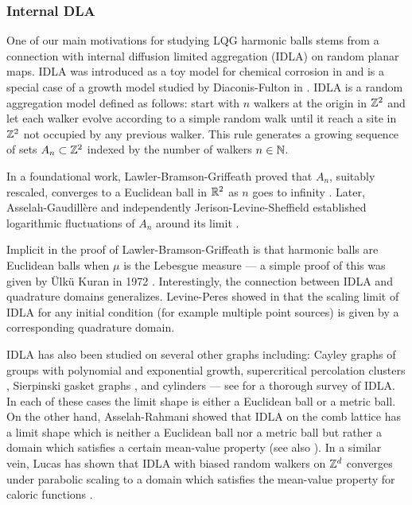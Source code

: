 \documentclass[12pt]{amsart}
\numberwithin{equation}{section}
\begin{document}
	
	
	\subsubsection{Internal DLA}
	One of our main motivations for studying LQG harmonic balls stems from a connection with internal diffusion limited aggregation (IDLA) on random planar maps. 
	IDLA was introduced as a toy model for chemical corrosion in \cite{meakin1986formation} and is a special case of a growth model studied by Diaconis-Fulton in \cite{diaconis1991growth}. IDLA is a random aggregation model defined as follows: start with $n$ walkers at the origin in $\mathbb{Z}^2$ and let each walker evolve according to a simple random walk until it reach a site in $\mathbb{Z}^2$ not occupied by any previous walker. This rule
	generates a growing sequence of sets $A_n \subset \mathbb{Z}^2$ indexed by the number of walkers $n \in \mathbb{N}$. 
	
	In a foundational work, Lawler-Bramson-Griffeath proved that $A_n$, suitably rescaled, converges to a Euclidean ball in $\mathbb{R}^2$
	as $n$ goes to infinity \cite{lawler1992internal, lawler1995subdiffusive}. Later, Asselah-Gaudillère \cite{asselah2013logarithmic, asselah2013sublogarithmic} and independently Jerison-Levine-Sheffield established logarithmic fluctuations of $A_n$ around its limit \cite{jerison2012logarithmic, jerison2013internal, jerison2014internal}. 
	
	Implicit in the proof of Lawler-Bramson-Griffeath is that harmonic balls are Euclidean balls when $\mu$ is the Lebesgue measure ---
	a simple proof of this was given by {\"U}lk{\"u} Kuran in 1972 \cite{kuran1972mean}. Interestingly, the connection between IDLA and quadrature domains generalizes. Levine-Peres showed in \cite{levine2010scaling} that the scaling limit of IDLA for any initial condition (for example multiple point sources) is given by a corresponding quadrature domain. 
	
	IDLA has also been studied on several other graphs including: Cayley graphs of groups with polynomial \cite{blachere2001internal} and  exponential \cite{blachere2007internal, huss2008internal} growth, supercritical percolation clusters \cite{shellef2010idla, duminil2013containing}, Sierpinski gasket graphs \cite{chen2017internal}, and cylinders \cite{jerison2014chapter, levine2019long, silvestri2020internal}--- see \cite{sava2021fractals} for a thorough survey of IDLA. In each of these cases the limit shape is either a Euclidean ball or a metric ball. On the other hand, Asselah-Rahmani showed that IDLA on the comb lattice has a limit shape which is neither a Euclidean ball nor a metric ball but rather a domain which satisfies a certain mean-value property \cite{asselah2016fluctuations} (see also \cite{huss-sava-comb}). 
	In a similar vein, Lucas has shown that IDLA with biased random walkers on $\mathbb{Z}^d$ converges under parabolic scaling to a domain which satisfies the mean-value property for caloric functions \cite{lucas2014limiting}.  
	
\end{document}
